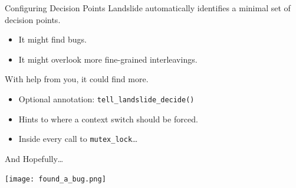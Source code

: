 \documentclass[xcolor=dvipsnames]{beamer}
\begin{document}
{\begin{frame}{Configuring Decision Points}
	Landslide automatically identifies a minimal set of decision points.
	\begin{itemize}
		\item It might find bugs.
		\item It might overlook more fine-grained interleavings.
	\end{itemize}
	\linegap
	With help from you, it could find more.
	\begin{itemize}
		\item Optional annotation: \texttt{tell\_landslide\_decide()}
		\item Hints to where a context switch should be forced.
		\item Inside every call to \texttt{mutex\_lock}\ldots
	\end{itemize}
\end{frame}

\begin{frame}{And Hopefully\dots}
	\begin{center}
		\texttt{[image: found\_a\_bug.png]}
	\end{center}
\end{frame}



%

}
\end{document}
